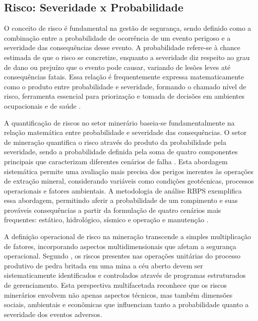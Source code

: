\subsection{Risco: Severidade x Probabilidade}
\label{subsec:risco}

O conceito de risco é fundamental na gestão de segurança, sendo definido como a combinação entre a probabilidade de ocorrência de um evento perigoso e a severidade das consequências desse evento. A probabilidade refere-se à chance estimada de que o risco se concretize, enquanto a severidade diz respeito ao grau de dano ou prejuízo que o evento pode causar, variando de lesões leves até consequências fatais. Essa relação é frequentemente expressa matematicamente como o produto entre probabilidade e severidade, formando o chamado nível de risco, ferramenta essencial para priorização e tomada de decisões em ambientes ocupacionais e de saúde \cite{sistemaeso2021avaliacao, sistemaeso2021matriz, segurancatemfuturo}.

A quantificação de riscos no setor minerário baseia-se fundamentalmente na relação matemática entre probabilidade e severidade das consequências. O setor de mineração quantifica o risco através do produto da probabilidade pela severidade, sendo a probabilidade definida pela soma de quatro componentes principais que caracterizam diferentes cenários de falha \cite{iramina2009}. Esta abordagem sistemática permite uma avaliação mais precisa dos perigos inerentes às operações de extração mineral, considerando variáveis como condições geotécnicas, processos operacionais e fatores ambientais. A metodologia de análise RBPS exemplifica essa abordagem, permitindo aferir a probabilidade de um rompimento e suas prováveis consequências a partir da formulação de quatro cenários mais frequentes: estático, hidrológico, sísmico e operação e manutenção \cite{conceicao2018}.

A definição operacional de risco na mineração transcende a simples multiplicação de fatores, incorporando aspectos multidimensionais que afetam a segurança operacional. Segundo , os riscos presentes nas operações unitárias do processo produtivo de pedra britada em uma mina a céu aberto devem ser sistematicamente identificados e controlados através de programas estruturados de gerenciamento. Esta perspectiva multifacetada reconhece que os riscos minerários envolvem não apenas aspectos técnicos, mas também dimensões sociais, ambientais e econômicas que influenciam tanto a probabilidade quanto a severidade dos eventos adversos.

